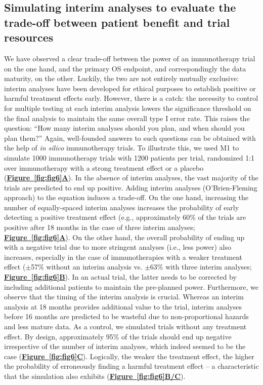 \documentclass[a4paper,10pt]{article}
\newcommand{\myref}[2]{\hyperref[#1]{\bfseries Figure~\ref*{#1}#2}}
\begin{document}
\subsection*{Simulating interim analyses to evaluate the trade-off between patient benefit and trial resources}
We have observed a clear trade-off between the power of an immunotherapy trial
on the one hand, and the primary OS endpoint, and correspondingly the data
maturity, on the other. Luckily, the two are not entirely mutually exclusive:
interim analyses have been developed for ethical purposes to establish positive
or harmful treatment effects early. However, there is a catch: the necessity to
control for multiple testing at each interim analysis lowers the significance
threshold on the final analysis to maintain the same overall type I error rate.
This raises the question: ``How many interim analyses should you plan, and when
should you plan them?'' Again, well-founded answers to such questions can be
obtained with the help of \emph{in silico} immunotherapy trials. To illustrate this,
we used M1 to simulate 1000 immunotherapy trials with 1200 patients per trial, randomized
1:1 over immunotherapy with a strong treatment effect or a placebo (\myref{fig:fig6}{A}).
In the absence of interim analyses, the vast majority of the trials are
predicted to end up positive. Adding interim analyses (O'Brien-Fleming
approach) to the equation induces a trade-off. On the one hand, increasing the
number of equally-spaced interim analyses increases the probability of early
detecting a positive treatment effect (e.g., approximately 60\% of the trials
are positive after 18 months in the case of three interim analyses; \myref{fig:fig6}{A}).
On the other hand, the overall probability of ending up with a negative trial
due to more stringent analyses (i.e., less power) also increases, especially in
the case of immunotherapies with a weaker treatment effect ($\pm$57\% without
an interim analysis vs. $\pm$63\% with three interim analyses; \myref{fig:fig6}{B}). In
an actual trial, the latter needs to be corrected by including additional
patients to maintain the pre-planned power. Furthermore, we observe that the
timing of the interim analysis is crucial. Whereas an interim analysis at 18
months provides additional value to the trial, interim analyses before 16
months are predicted to be wasteful due to
non-proportional hazards and less mature data. As a control, we simulated
trials without any treatment effect. By design, approximately 95\% of the
trials should end up negative irrespective of the number of interim analyses,
which indeed seemed to be the case (\myref{fig:fig6}{C}). 
Logically, the weaker the treatment
effect, the higher the probability of erroneously finding a harmful treatment
effect -- a characteristic that the simulation also exhibits (\myref{fig:fig6}{B/C}).
\end{document}
